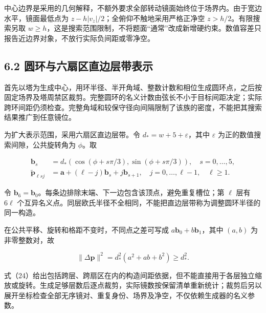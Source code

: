 \documentclass[UTF8,fontset=windows,zihao=-4]{ctexart}
\begin{document}
中心边界是采用的几何解释，不额外要求全部转动镜面始终位于场界内。由于宽边水平，镜面最低点为 \(z-h|v_z|/2\)；全俯仰不触地采用严格正净空 \(z>h/2\)。有限搜索另取 \(w\ge h\)，这是搜索范围限制，不将题面“通常”改成新增硬约束。数值容差只报告近边界对象，不放行实际负间距或零净空。

\subsection*{6.2 圆环与六扇区直边层带表示}

首先以塔为生成中心，用环半径、半开角域、整数计数和相位生成圆环点，之后按固定场界及塔周禁区裁剪。完整圆环的名义计数由弦长不小于目标间距决定；实际跨环间距仍须检查。完整角域和较保守径向间隔限制了该族的密度，不能把其搜索结果推广到任意镜位。

\par\noindent\begin{minipage}{\linewidth}
为扩大表示范围，采用六扇区直边层带。令 \(d_*=w+5+\varepsilon\)，其中 \(\varepsilon\) 为正的数值搜索间隙，公共旋转角为 \(\phi\)。取

\[
\begin{aligned}
\boldsymbol b_s&=d_*(\cos(\phi+s\pi/3),\sin(\phi+s\pi/3)),\quad s=0,\ldots,5,\\
\widetilde{\boldsymbol p}_{\ell sj}
&=\boldsymbol a+(\ell-j)\boldsymbol b_s+j\boldsymbol b_{s+1},
\quad j=0,\ldots,\ell-1,\quad\ell\ge1.
\end{aligned}\tag{23}
\]
\end{minipage}\par

令 \(\boldsymbol b_6=\boldsymbol b_0\)。每条边排除末端、下一边包含该顶点，避免重复槽位；第 \(\ell\) 层有 \(6\ell\) 个互异名义点。同层欧氏半径不全相同，不能把直边层带称为调整圆环半径的同一构造。

\par\noindent\begin{minipage}{\linewidth}
在公共平移、旋转和格距不变时，不同点之差可写成 \(a\boldsymbol b_0+b\boldsymbol b_1\)，其中 \((a,b)\) 为非零整数对，故

\[
\|\Delta\boldsymbol p\|^2=d_*^2(a^2+ab+b^2)\ge d_*^2.
\tag{24}
\]
\end{minipage}\par

式（24）给出包括跨层、跨扇区在内的构造间距依据，但不能直接用于各层独立缩放或旋转。生成足够层数后逐点裁剪，实际镜数按保留清单重新统计；裁剪后另以展开坐标检查全部无序镜对、重复身份、场界及净空，不仅依赖生成器的名义参数。
\end{document}
